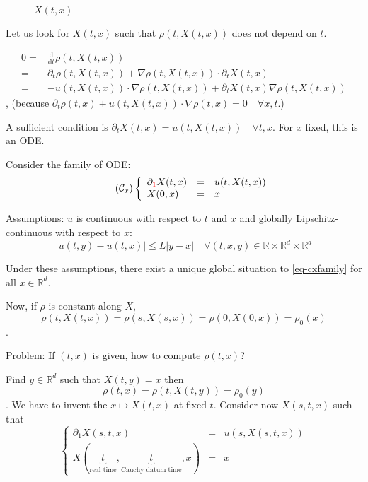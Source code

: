 \documentclass{report}
\newcommand{\R}{\ensuremath{\mathbb{R}}} %
\newcommand*{\definition}[1]{\noindent\textbf{\color{cadmiumgreen}{#1}}}
\theoremstyle{plain}
\theoremstyle{definition}
\theoremstyle{remark}
\begin{document}
\begin{figure}[h!]
	\centering
{}
	\caption{ $X(t,x)$}
\end{figure}

Let us look for $X(t,x)$ such that $\rho(t,X(t,x))$ does not
depend on $t$.

\begin{align*}
	0 = & \frac{\text{d}}{\text{d}t} \rho(t,X(t,x)) \\
	= & \partial_t \rho(t,X(t,x)) +\nabla \rho(t,X(t,x))
	\cdot \partial_t X(t,x)\\
	= & -u(t,X(t,x))\cdot \nabla\rho(t,X(t,x)) +
	\partial_t X(t,x)\nabla\rho(t,X(t,x)) 
\end{align*},
(because $\partial_t \rho(t,x) +u(t,X(t,x))\cdot \nabla\rho(t,x)
=0 \quad \forall x, t$.)

A sufficient condition is $\partial_t X(t,x) = u(t,X(t,x))
\quad \forall t, x$. For $x$ fixed, this is an ODE.

Consider the family of ODE:
\begin{equation}
	\tag{$\mathcal{C}_x$}
	\left\lbrace
	\begin{array}{lclc}
		\partial_{\color{red}{1}} X(t,x) &=& u(t,X(t,x)) \\
	X(0,x) &=& x 
	\end{array}
    \right.
    \label{eq-cxfamily}
\end{equation}

Assumptions: $u$ is continuous with respect to $t$ and $x$
and globally Lipschitz-continuous with respect to $x$:
$$\vert u(t,y) -u(t,x)\vert \leq L\vert y-x\vert \quad
\forall (t,x,y)\in \R\times\R^d\times\R^d$$

Under these assumptions, there exist a unique global situation
to \eqref{eq-cxfamily} for all $x\in\R^d$.

Now, if $\rho$ is constant along $X$,
$$\rho(t,X(t,x)) = \rho(s,X(s,x)) = \rho(0,X(0,x)) = \rho_0(x)$$.

Problem:
If $(t,x)$ is given, how to compute $\rho(t,x)$?

Find $y\in\R^d$ such that $X(t,y) = x$ then
$$\rho(t,x) = \rho(t,X(t,y)) = \rho_0(y)$$.
We have to invent the \definition{characteristic (curve)}
$x\mapsto X(t,x)$ at fixed $t$.
Consider now $X(s,t,x)$ such that
\begin{equation}
	\left\lbrace
	\begin{array}{lclc}
		\partial_1 X(s,t,x) &=& u(s,X(s,t,x)) \\
		X(\underbrace{t}_{\text{real time}},
		\underbrace{t}_{\text{Cauchy datum time}},x) &=& x 
	\end{array}
    \right.
\end{equation}
\end{document}
